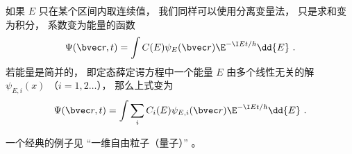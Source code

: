 如果 $E$ 只在某个区间内取连续值， 我们同样可以使用分离变量法， 只是求和变为积分， 系数变为能量的函数
\begin{equation}\label{eq_TDSE_3}
\Psi(\bvec r, t) = \int C(E) \psi_E(\bvec r) \E^{-\I E t/\hbar} \dd{E}~.
\end{equation}
若能量是简并的， 即定态薛定谔方程中一个能量 $E$ 由多个线性无关的解 $\psi_{E,i}(x)$ （$i=1,2\dots$）， 那么上式变为
\begin{equation}\label{eq_TDSE_4}
\Psi(\bvec r, t) = \int \sum_i C_i(E) \psi_{E,i}(\bvec r) \E^{-\I E t/\hbar} \dd{E}~.
\end{equation}

一个经典的例子见 “一维自由粒子（量子）” 。
